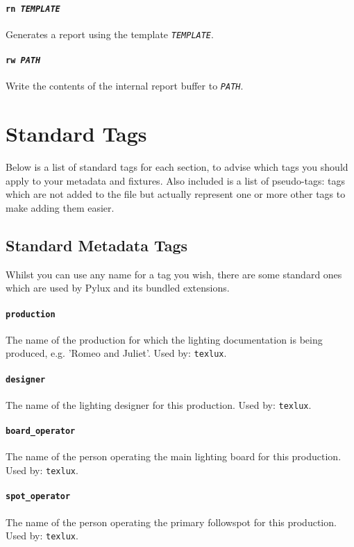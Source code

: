 \documentclass[a4paper]{article}
\begin{document}
\paragraph{\texttt{rn \textit{TEMPLATE}}}
Generates a report using the template \texttt{\textit{TEMPLATE}}. 

\paragraph{\texttt{rw \textit{PATH}}}
Write the contents of the internal report buffer to \texttt{\textit{PATH}}.

\section{Standard Tags} \label{sec:plotfile}
Below is a list of standard tags for each section, to advise which tags you 
should apply to your metadata and fixtures. Also included is a list of 
pseudo-tags: tags which are not added to the file but actually represent one 
or more other tags to make adding them easier.

\subsection{Standard Metadata Tags}
Whilst you can use any name for a tag you wish, there are some standard ones 
which are used by Pylux and its bundled extensions.

\paragraph{\texttt{production}}
The name of the production for which the lighting documentation is being 
produced, e.g. 'Romeo and Juliet'. Used by: \texttt{texlux}.

\paragraph{\texttt{designer}}
The name of the lighting designer for this production. Used by: 
\texttt{texlux}.

\paragraph{\texttt{board\_operator}}
The name of the person operating the main lighting board for this production.
Used by: \texttt{texlux}.

\paragraph{\texttt{spot\_operator}}
The name of the person operating the primary followspot for this production.
Used by: \texttt{texlux}.
\end{document}
